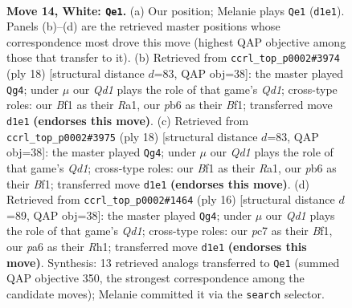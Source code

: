 \documentclass[11pt]{article}
\begin{document}
\clearpage

\begin{figure}[p]\centering
\begin{subfigure}{0.46\textwidth}\centering
\resizebox{\linewidth}{!}{%
\newchessgame
\chessboard[
  setfen={rnb1r1k1/2pnq1pp/pp2p3/3pPp2/3P1P1P/8/PPPKN1P1/1R1Q1BNR w - - 2 14},
  showmover=false,
  pgfstyle=straightmove, color=movearrow, markmove={d1-e1}
]}
\caption{}
\end{subfigure}\hfill
\begin{subfigure}{0.46\textwidth}\centering
\resizebox{\linewidth}{!}{%
\newchessgame
\chessboard[
  setfen={rnb1k2r/pppnqppp/4p3/3pP3/3P4/2N3PN/PPP2P2/R2QKB1R w KQkq - 1 10},
  showmover=false,
  pgfstyle=straightmove, color=movearrow, markmove={d1-g4}
]}
\caption{}
\end{subfigure}
\\[4pt]
\begin{subfigure}{0.46\textwidth}\centering
\resizebox{\linewidth}{!}{%
\newchessgame
\chessboard[
  setfen={rnb1k2r/pppnqppp/4p3/3pP3/3P4/2N3PN/PPP2P2/R2QKB1R w KQkq - 1 10},
  showmover=false,
  pgfstyle=straightmove, color=movearrow, markmove={d1-g4}
]}
\caption{}
\end{subfigure}\hfill
\begin{subfigure}{0.46\textwidth}\centering
\resizebox{\linewidth}{!}{%
\newchessgame
\chessboard[
  setfen={rnb1k2r/pppnqppp/4p3/3pP3/3P4/2N4N/PPP2PP1/R2QKB1R w KQkq - 2 9},
  showmover=false,
  pgfstyle=straightmove, color=movearrow, markmove={d1-g4}
]}
\caption{}
\end{subfigure}
\caption{\textbf{Move 14, White: \texttt{Qe1}.} (a) Our position; Melanie plays \texttt{Qe1} (\texttt{d1e1}). Panels (b)--(d) are the retrieved master positions whose correspondence most drove this move (highest QAP objective among those that transfer to it). (b) Retrieved from \texttt{ccrl\_top\_p0002\#3974} (ply 18) [structural distance $d$=83, QAP obj=38]: the master played \texttt{Qg4}; under $\mu$ our \emph{Qd1} plays the role of that game's \emph{Qd1}; cross-type roles: our \emph{B}f1 as their \emph{R}a1, our \emph{p}b6 as their \emph{B}f1; transferred move \texttt{d1e1} \textbf{(endorses this move)}. (c) Retrieved from \texttt{ccrl\_top\_p0002\#3975} (ply 18) [structural distance $d$=83, QAP obj=38]: the master played \texttt{Qg4}; under $\mu$ our \emph{Qd1} plays the role of that game's \emph{Qd1}; cross-type roles: our \emph{B}f1 as their \emph{R}a1, our \emph{p}b6 as their \emph{B}f1; transferred move \texttt{d1e1} \textbf{(endorses this move)}. (d) Retrieved from \texttt{ccrl\_top\_p0002\#1464} (ply 16) [structural distance $d$=89, QAP obj=38]: the master played \texttt{Qg4}; under $\mu$ our \emph{Qd1} plays the role of that game's \emph{Qd1}; cross-type roles: our \emph{p}c7 as their \emph{B}f1, our \emph{p}a6 as their \emph{R}h1; transferred move \texttt{d1e1} \textbf{(endorses this move)}. Synthesis: 13 retrieved analogs transferred to \texttt{Qe1} (summed QAP objective 350, the strongest correspondence among the candidate moves); Melanie committed it via the \texttt{search} selector.}
\label{fig:thought-m26}
\end{figure}
\end{document}
